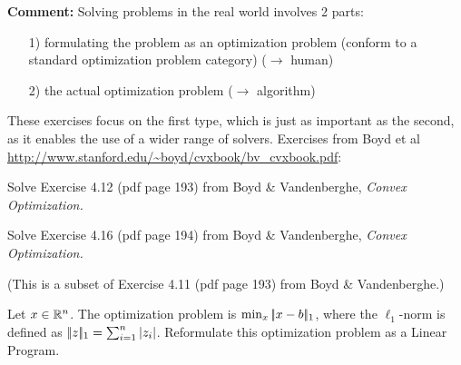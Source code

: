 

\renewcommand{\course}{Maths for Intelligent Systems}
\renewcommand{\coursedate}{Summer 2019}

\renewcommand{\exnum}{Exercise 9}

\exercises


\exercisestitle


\textbf{Comment:} Solving problems in the real world involves 2 parts:
\begin{enumerate}
\item[1)] formulating the problem as an optimization problem (conform to a
standard optimization problem category) ($\to$ human)
\item[2)] the actual optimization problem ($\to$ algorithm)
\end{enumerate}

These exercises focus on the first type, which is just as important as the
second, as it enables the use of a wider range of solvers.  Exercises from Boyd
et al \url{http://www.stanford.edu/~boyd/cvxbook/bv_cvxbook.pdf}:



Solve Exercise 4.12 (pdf page 193) from  Boyd \& Vandenberghe,
\emph{Convex Optimization.}



Solve Exercise 4.16 (pdf page 194) from  Boyd \& Vandenberghe,
\emph{Convex Optimization.}



(This is a subset of  Exercise 4.11 (pdf page 193) from  Boyd \& Vandenberghe.)

Let $x\in{\mathbb{R}}^n$. The optimization problem is $\min_x |\!|x-b|\!|_1$,
where the $\ell_1$-norm is defined as $|\!|z|\!|_1 = \sum_{i=1}^n
|z_i|$. Reformulate this optimization problem as a Linear Program.


